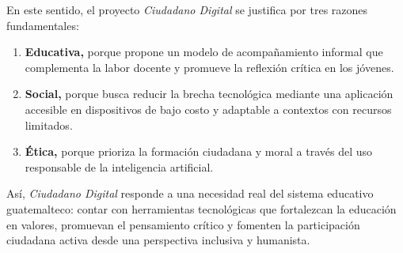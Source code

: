 En este sentido, el proyecto \textit{Ciudadano Digital} se justifica por tres razones
fundamentales:
\begin{enumerate}
    \item \textbf{Educativa,} porque propone un modelo de acompañamiento informal que complementa
          la labor docente y promueve la reflexión crítica en los jóvenes.
    \item \textbf{Social,} porque busca reducir la brecha tecnológica mediante una aplicación
          accesible en dispositivos de bajo costo y adaptable a contextos con recursos
          limitados.
    \item \textbf{Ética,} porque prioriza la formación ciudadana y moral a través del uso responsable de la inteligencia artificial.
\end{enumerate}

Así, \textit{Ciudadano Digital} responde a una necesidad real del sistema educativo
guatemalteco: contar con herramientas tecnológicas que fortalezcan la educación
en valores, promuevan el pensamiento crítico y fomenten la participación
ciudadana activa desde una perspectiva inclusiva y humanista.